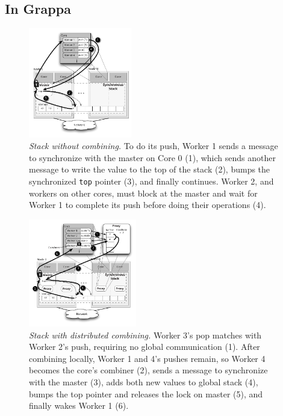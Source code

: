 \subsection{In Grappa}

\begin{figure}[t]
    \centering
    \includegraphics[width=0.40\textwidth]{figs/stack_nofc.pdf}
    \caption{\emph{Stack without combining.}
      To do its push, Worker 1 sends a message to synchronize with the master on Core 0 (1), which sends another message to write the value to the top of the stack (2), bumps the synchronized \texttt{top} pointer (3), and finally continues. Worker 2, and workers on other cores, must block at the master and wait for Worker 1 to complete its push before doing their operations (4).
    }
    \label{fig:stacknofc}
\end{figure}
\begin{figure}
    \centering
    \includegraphics[width=0.42\textwidth]{figs/stack_fc.pdf}
    \caption{\emph{Stack with distributed combining.}
      Worker 3's pop matches with Worker 2's push, requiring no global communication (1). After combining locally, Worker 1 and 4's pushes remain, so Worker 4 becomes the core's combiner (2), sends a message to synchronize with the master (3), adds both new values to global stack (4), bumps the top pointer and releases the lock on master (5), and finally wakes Worker 1 (6).
    }
    \label{fig:stackfc}
\end{figure}

